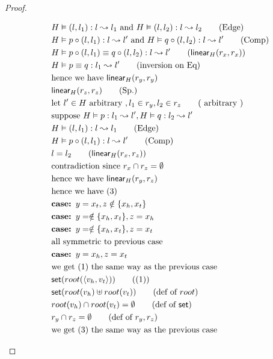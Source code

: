 \documentclass[11pt]{article}
\newcommand{\ms}[1]{\ensuremath{\mathsf{#1}}}
\begin{document}
\begin{proof}
\begin{description}
\begin{align*}
  &\quad H \vDash (l,l_1) : l \leadsto l_1 \text{ and }  H \vDash (l,l_2) : l \leadsto l_2 \tag{Edge}\\
  &\quad H \vDash p \circ (l,l_1) : l \leadsto l' \text{ and }  H \vDash q \circ (l,l_2) : l \leadsto l' \tag{Comp}\\
  &\quad H \vDash p \circ (l,l_1) \equiv q \circ (l,l_2) : l \leadsto l' \tag{$\ms{linear}_H(r_x,r_x)$}\\
  &\quad H \vDash p \equiv q : l_1 \leadsto l' \tag{inversion on Eq}\\
  &\quad \text{hence we have } \ms{linear}_H(r_y,r_y)\\
  &\quad \ms{linear}_H(r_z,r_z) \tag{Sp.}\\
  &\quad \text{let } l' \in H \text{ arbitrary }, l_1 \in r_y, l_2 \in r_z \tag{ arbitrary }\\
  &\quad \text{suppose } H \vDash p : l_1 \leadsto l', H \vDash q : l_2 \leadsto l'\\
  &\quad H \vDash (l,l_1) : l \leadsto l_1 \tag{Edge}\\
  &\quad H \vDash p \circ (l,l_1) : l \leadsto l' \tag{Comp}\\
  &\quad l = l_2 \tag{$\ms{linear}_H(r_x,r_z)$}\\
  &\quad \text{contradiction since } r_x \cap r_z = \emptyset\\
  &\quad \text{hence we have } \ms{linear}_H(r_y,r_z)\\
  &\quad \text{hence we have (3)}\\
  &\quad\textbf{case: } y = x_t, z \notin \{x_h,x_t\}\\
  &\quad\textbf{case: } y = \notin \{x_h,x_t\}, z = x_h\\
  &\quad\textbf{case: } y = \notin \{x_h,x_t\}, z = x_t\\
  &\quad \text{all symmetric to previous case}\\
  &\quad\textbf{case: } y = x_h, z = x_t\\
  &\quad \text{we get (1) the same way as the previous case}\\
  &\quad \ms{set}(root(\pairexcst{v_h}{v_t})) \tag{(1)}\\
  &\quad \ms{set}(root(v_h) \uplus root(v_t)) \tag{def of $root$}\\
  &\quad root(v_h) \cap root(v_t) = \emptyset \tag{def of $\ms{set}$}\\
  &\quad r_y \cap r_z = \emptyset \tag{def of $r_y,r_z$}\\
  &\quad \text{we get (3) the same way as the previous case}\\

\end{align*}
\end{description}
\end{proof}
\end{document}
